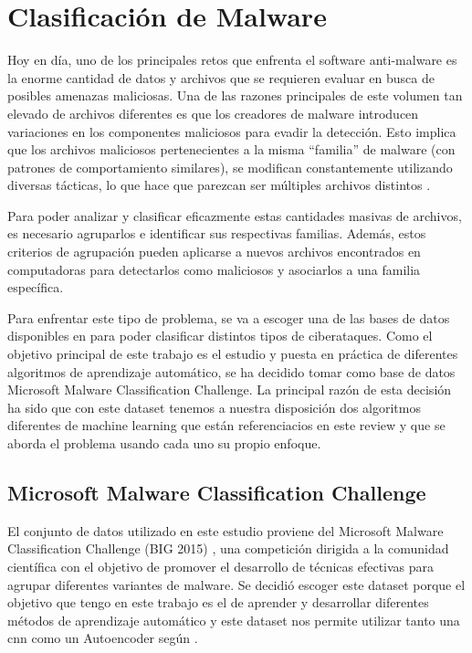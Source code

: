 \chapter{Clasificación de Malware} \label{Capitulo_3}

Hoy en día, uno de los principales retos que enfrenta el software anti-malware es la enorme cantidad de datos y archivos que se requieren evaluar en busca de posibles amenazas maliciosas. Una de las razones principales de este volumen tan elevado de archivos diferentes es que los creadores de malware introducen variaciones en los componentes maliciosos para evadir la detección. Esto implica que los archivos maliciosos pertenecientes a la misma ``familia'' de malware (con patrones de comportamiento similares), se modifican constantemente utilizando diversas tácticas, lo que hace que parezcan ser múltiples archivos distintos \citep{kagglebig2015}. 


Para poder analizar y clasificar eficazmente estas cantidades masivas de archivos, es necesario agruparlos e identificar sus respectivas familias. Además, estos criterios de agrupación pueden aplicarse a nuevos archivos encontrados en computadoras para detectarlos como maliciosos y asociarlos a una familia específica. 


Para enfrentar este tipo de problema, se va a escoger una de las bases de datos disponibles en \citep{podder2021artificial} para poder clasificar distintos tipos de ciberataques. Como el objetivo principal de este trabajo es el estudio y puesta en práctica de diferentes algoritmos de aprendizaje automático, se ha decidido tomar como base de datos Microsoft Malware Classification Challenge. La principal razón de esta decisión ha sido que con este dataset tenemos a nuestra disposición dos algoritmos diferentes de machine learning que están referenciacios en este review y que se aborda el problema usando cada uno su propio enfoque. 



\section{Microsoft Malware Classification Challenge}



El conjunto de datos utilizado en este estudio proviene del Microsoft Malware Classification Challenge (BIG 2015) \citep{kagglebig2015}, una competición dirigida a la comunidad científica con el objetivo de promover el desarrollo de técnicas efectivas para agrupar diferentes variantes de malware. Se decidió escoger este dataset porque el objetivo que tengo en este trabajo es el de aprender y desarrollar diferentes métodos de aprendizaje automático y este dataset nos permite utilizar tanto una \acrshort{cnn} como un Autoencoder según \citep{podder2021artificial}. 

